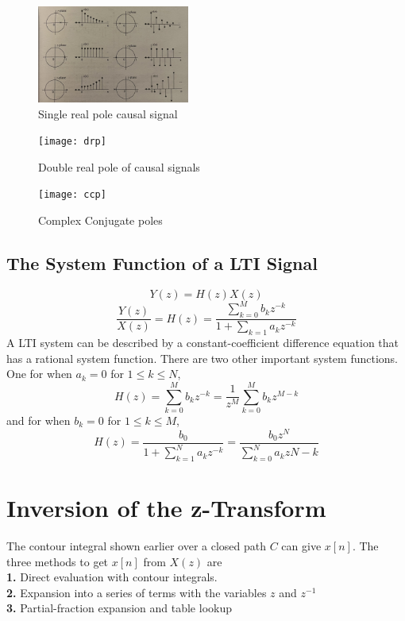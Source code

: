 \documentclass{article} %
\begin{document}
	\begin{figure}[h]
	\centering
	\includegraphics[width=5cm]{srp}
	\caption{Single real pole causal signal}
	\end{figure}
	
	\begin{figure}[h]
	\centering
	\texttt{[image: drp]}
	\caption{Double real pole of causal signals}
	\end{figure}
	
	\begin{figure}[h]
	\centering
	\texttt{[image: ccp]}
	\caption{Complex Conjugate poles}
	\end{figure}
	
	\subsection{The System Function of a LTI Signal}
	\begin{equation}
	Y(z) = H(z)X(z)
	\end{equation}
	\begin{equation}
	\frac{Y(z)}{X(z)} = H(z) = \frac{\sum_{k=0}^Mb_kz^{-k}}{1 + \sum_{k=1}a_kz^{-k}}
	\end{equation}
	A LTI system can be described by a constant-coefficient difference equation that has a rational system function. There are two other important system functions. One for when $a_k = 0$ for $1 \le k \le N$,
	\begin{equation}
	H(z) = \sum_{k=0}^Mb_kz^{-k} = \frac{1}{z^M} \sum_{k=0}^Mb_kz^{M-k}
	\end{equation}
	and for when $b_k = 0$ for $1 \le k \le M$, 
	\begin{equation}
	H(z) = \frac{b_0}{1+\sum_{k=1}^Na_kz^{-k}} = \frac{b_0z^N}{\sum_{k=0}^Na_kz{N-k}}
	\end{equation}
	
	\section{Inversion of the z-Transform}
	The contour integral shown earlier over a closed path $C$ can give $x[n]$. The three methods to get $x[n]$ from $X(z)$ are\\
	\textbf{1.} Direct evaluation with contour integrals.\\
	\textbf{2.} Expansion into a series of terms with the variables $z$ and $z^{-1}$\\
	\textbf{3.} Partial-fraction expansion and table lookup
	
\end{document}
